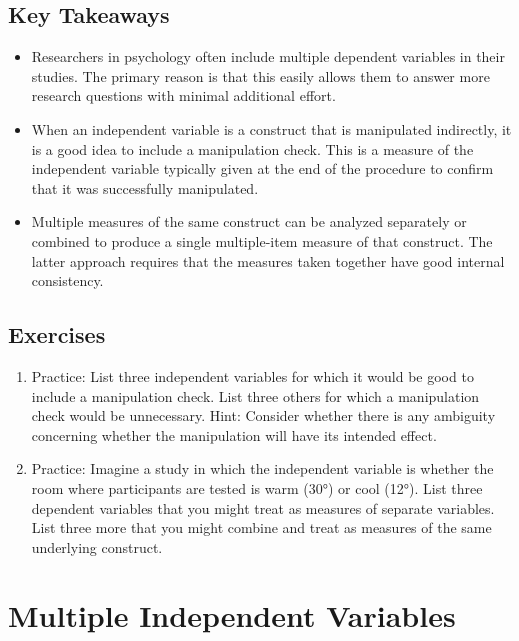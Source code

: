 \subsection{Key Takeaways}
\begin{fullwidth}
\begin{itemize}

\item Researchers in psychology often include multiple dependent variables in their studies. The primary reason is that this easily allows them to answer more research questions with minimal additional effort.
\item  When an independent variable is a construct that is manipulated indirectly, it is a good idea to include a manipulation check. This is a measure of the independent variable typically given at the end of the procedure to confirm that it was successfully manipulated.
\item  Multiple measures of the same construct can be analyzed separately or combined to produce a single multiple-item measure of that construct. The latter approach requires that the measures taken together have good internal consistency.


\end{itemize}
\end{fullwidth}


\subsection{Exercises}
\begin{fullwidth}
\begin{enumerate}
\item  Practice: List three independent variables for which it would be good to include a manipulation check. List three others for which a manipulation check would be unnecessary. Hint: Consider whether there is any ambiguity concerning whether the manipulation will have its intended effect.
\item Practice: Imagine a study in which the independent variable is whether the room where participants are tested is warm (30°) or cool (12°). List three dependent variables that you might treat as measures of separate variables. List three more that you might combine and treat as measures of the same underlying construct.
\end{enumerate}
\end{fullwidth}

\newpage
\section{Multiple Independent Variables}

